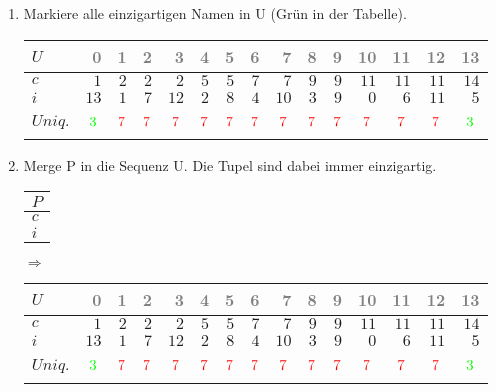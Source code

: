 \begin{enumerate}
\item 
Markiere alle einzigartigen Namen in U (Grün in der Tabelle).
\begin{center}
\small\begin{tabular}{lrrrrrrrrrrrrrr}
    \toprule 
    $U$ & \textcolor{gray}{0} & \textcolor{gray}{1} & \textcolor{gray}{2} & \textcolor{gray}{3} & \textcolor{gray}{4} & \textcolor{gray}{5} & \textcolor{gray}{6} & \textcolor{gray}{7} & \textcolor{gray}{8} & \textcolor{gray}{9} & \textcolor{gray}{10} & \textcolor{gray}{11} & \textcolor{gray}{12} & \textcolor{gray}{13}\\
    \midrule 
    $c$ & $1$ & $2$ & $2$ & $2$ & $5$ & $5$ & $7$ & $7$ & $9$ & $9$ & $11$ & $11$ & $11$ & $14$ \\
    $i$ & $13$ & $1$ & $7$ & $12$ & $2$ & $8$ & $4$ & $10$ & $3$ & $9$ & $0$ & $6$ & $11$ & $5$ \\
    $Uniq.$ & $$\cmarkc$$ & $$\xmarkc$$ & $$\xmarkc$$ & $$\xmarkc$$ & $$\xmarkc$$ & $$\xmarkc$$ & $$\xmarkc$$ & $$\xmarkc$$ & $$\xmarkc$$ & $$\xmarkc$$ & $$\xmarkc$$ & $$\xmarkc$$ & $$\xmarkc$$ & $$\cmarkc$$ \\
    \bottomrule 
\end{tabular}
\end{center}

\item 
Merge P in die Sequenz U. Die Tupel sind dabei immer einzigartig.
\begin{center}
\small\begin{tabular}{l}
    \toprule 
    $P$\\
    \midrule 
    $c$ \\
    $i$ \\
    \bottomrule 
\end{tabular}
\end{center}
\begin{center}
$\Rightarrow$
\end{center}
\begin{center}
\small\begin{tabular}{lrrrrrrrrrrrrrr}
    \toprule 
    $U$ & \textcolor{gray}{0} & \textcolor{gray}{1} & \textcolor{gray}{2} & \textcolor{gray}{3} & \textcolor{gray}{4} & \textcolor{gray}{5} & \textcolor{gray}{6} & \textcolor{gray}{7} & \textcolor{gray}{8} & \textcolor{gray}{9} & \textcolor{gray}{10} & \textcolor{gray}{11} & \textcolor{gray}{12} & \textcolor{gray}{13}\\
    \midrule 
    $c$ & $1$ & $2$ & $2$ & $2$ & $5$ & $5$ & $7$ & $7$ & $9$ & $9$ & $11$ & $11$ & $11$ & $14$ \\
    $i$ & $13$ & $1$ & $7$ & $12$ & $2$ & $8$ & $4$ & $10$ & $3$ & $9$ & $0$ & $6$ & $11$ & $5$ \\
    $Uniq.$ & $$\cmarkc$$ & $$\xmarkc$$ & $$\xmarkc$$ & $$\xmarkc$$ & $$\xmarkc$$ & $$\xmarkc$$ & $$\xmarkc$$ & $$\xmarkc$$ & $$\xmarkc$$ & $$\xmarkc$$ & $$\xmarkc$$ & $$\xmarkc$$ & $$\xmarkc$$ & $$\cmarkc$$ \\
    \bottomrule 
\end{tabular}
\end{center}


\end{enumerate}
